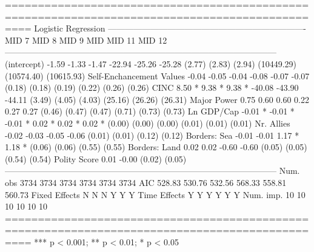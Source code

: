 
================================================================================================
                                                    Logistic Regression                         
                          ----------------------------------------------------------------------
                          MID 7      MID 8      MID 9      MID          MID 11       MID 12     
------------------------------------------------------------------------------------------------
(intercept)                 -1.59      -1.33      -1.47       -22.94       -25.26       -25.28  
                            (2.77)     (2.83)     (2.94)   (10449.29)   (10574.40)   (10615.93) 
Self-Enchancement Values    -0.04      -0.05      -0.04        -0.08        -0.07        -0.07  
                            (0.18)     (0.18)     (0.19)       (0.22)       (0.26)       (0.26) 
CINC                         8.50 *     9.38 *     9.38 *     -40.08       -43.90       -44.11  
                            (3.49)     (4.05)     (4.03)      (25.16)      (26.26)      (26.31) 
Major Power                  0.75       0.60       0.60         0.22         0.27         0.27  
                            (0.46)     (0.47)     (0.47)       (0.71)       (0.73)       (0.73) 
Ln GDP/Cap                  -0.01 *    -0.01 *    -0.01 *       0.02 *       0.02 *       0.02 *
                            (0.00)     (0.00)     (0.00)       (0.01)       (0.01)       (0.01) 
Nr. Allies                             -0.02      -0.03                     -0.05        -0.06  
                                       (0.01)     (0.01)                    (0.12)       (0.12) 
Borders: Sea                           -0.01      -0.01                      1.17 *       1.18 *
                                       (0.06)     (0.06)                    (0.55)       (0.55) 
Borders: Land                           0.02       0.02                     -0.60        -0.60  
                                       (0.05)     (0.05)                    (0.54)       (0.54) 
Polity Score                                       0.01                                  -0.00  
                                                  (0.02)                                 (0.05) 
------------------------------------------------------------------------------------------------
Num. obs                  3734       3734       3734         3734         3734         3734     
AIC                        528.83     530.76     532.56       568.33       558.81       560.73  
Fixed Effects                N          N          N            Y            Y            Y     
Time Effects                 Y          Y          Y            Y            Y            Y     
Num. imp.                   10         10         10           10           10           10     
================================================================================================
*** p < 0.001; ** p < 0.01; * p < 0.05

